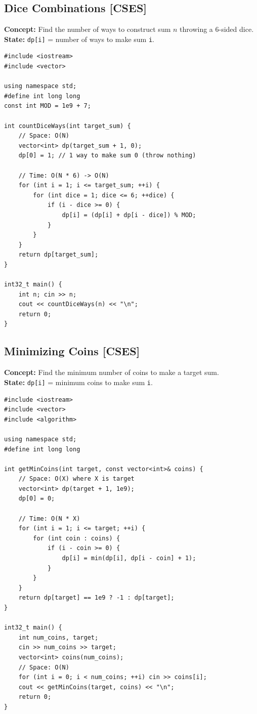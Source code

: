 \subsection{Dice Combinations [CSES]}
\textbf{Concept:} Find the number of ways to construct sum $n$ throwing a 6-sided dice.
\\
\textbf{State:} \texttt{dp[i]} = number of ways to make sum \texttt{i}.

\begin{lstlisting}
#include <iostream>
#include <vector>

using namespace std;
#define int long long
const int MOD = 1e9 + 7;

int countDiceWays(int target_sum) {
    // Space: O(N)
    vector<int> dp(target_sum + 1, 0);
    dp[0] = 1; // 1 way to make sum 0 (throw nothing)
    
    // Time: O(N * 6) -> O(N)
    for (int i = 1; i <= target_sum; ++i) {
        for (int dice = 1; dice <= 6; ++dice) {
            if (i - dice >= 0) {
                dp[i] = (dp[i] + dp[i - dice]) % MOD;
            }
        }
    }
    return dp[target_sum];
}

int32_t main() {
    int n; cin >> n;
    cout << countDiceWays(n) << "\n";
    return 0;
}
\end{lstlisting}

\subsection{Minimizing Coins [CSES]}
\textbf{Concept:} Find the minimum number of coins to make a target sum.
\\
\textbf{State:} \texttt{dp[i]} = minimum coins to make sum \texttt{i}.

\begin{lstlisting}
#include <iostream>
#include <vector>
#include <algorithm>

using namespace std;
#define int long long

int getMinCoins(int target, const vector<int>& coins) {
    // Space: O(X) where X is target
    vector<int> dp(target + 1, 1e9);
    dp[0] = 0;
    
    // Time: O(N * X)
    for (int i = 1; i <= target; ++i) {
        for (int coin : coins) {
            if (i - coin >= 0) {
                dp[i] = min(dp[i], dp[i - coin] + 1);
            }
        }
    }
    return dp[target] == 1e9 ? -1 : dp[target];
}

int32_t main() {
    int num_coins, target; 
    cin >> num_coins >> target;
    vector<int> coins(num_coins);
    // Space: O(N)
    for (int i = 0; i < num_coins; ++i) cin >> coins[i];
    cout << getMinCoins(target, coins) << "\n";
    return 0;
}
\end{lstlisting}

